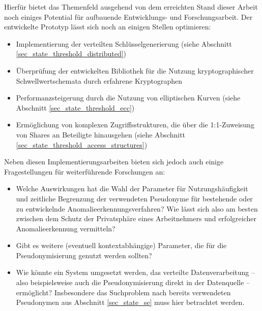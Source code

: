 %

Hierfür bietet das Themenfeld ausgehend von dem erreichten Stand dieser Arbeit noch einiges Potential für aufbauende Entwicklungs- und Forschungsarbeit. Der entwickelte Prototyp lässt sich noch an einigen Stellen optimieren:

\begin{itemize}
  \item Implementierung der verteilten Schlüsselgenerierung (siehe Abschnitt \ref{sec_state_threshold_distributed})
  \item Überprüfung der entwickelten Bibliothek für die Nutzung kryptographischer Schwellwertschemata durch erfahrene Kryptographen
  \item Performanzsteigerung durch die Nutzung von elliptischen Kurven (siehe Abschnitt \ref{sec_state_threshold_ecc})
  \item Ermöglichung von komplexen Zugriffsstrukturen, die über die 1:1-Zuweisung von Shares an Beteiligte hinausgehen (siehe Abschnitt \ref{sec_state_threshold_access_structures})
\end{itemize}

Neben diesen Implementierungsarbeiten bieten sich jedoch auch einige Fragestellungen für weiterführende Forschungen an:

\begin{itemize}
  \item Welche Auswirkungen hat die Wahl der Parameter für Nutzungshäufigkeit und zeitliche Begrenzung der verwendeten Pseudonyme für bestehende oder zu entwickelnde Anomalieerkennungsverfahren? Wie lässt sich also am besten zwischen dem Schutz der Privatsphäre eines Arbeitnehmers und erfolgreicher Anomalieerkennung vermitteln?
  \item Gibt es weitere (eventuell kontextabhängige) Parameter, die für die Pseudonymisierung genutzt werden sollten?
  \item Wie könnte ein System umgesetzt werden, das verteilte Datenverarbeitung -- also beispielsweise auch die Pseudonymisierung direkt in der Datenquelle -- ermöglicht? Insbesondere das Suchproblem nach bereits verwendeten Pseudonymen aus Abschnitt \ref{sec_state_se} muss hier betrachtet werden.
\end{itemize}



